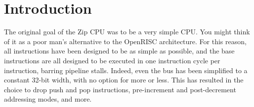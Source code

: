 \documentclass{gqtekspec}
\begin{document}
\chapter{Introduction}
\setcounter{page}{1}

The original goal of the Zip CPU was to be a very simple CPU.   You might
think of it as a poor man's alternative to the OpenRISC architecture.
For this reason, all instructions have been designed to be as simple as
possible, and the base instructions are all designed to be executed in one
instruction cycle per instruction, barring pipeline stalls.  Indeed, even the
bus has been simplified to a constant 32-bit width, with no option for more
or less.  This has resulted in the choice to drop push and pop instructions,
pre-increment and post-decrement addressing modes, and more.
\end{document}
